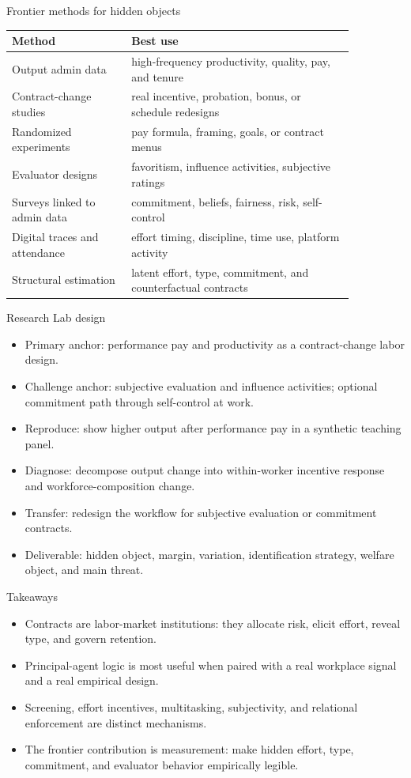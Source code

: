 \documentclass[aspectratio=169,11pt]{beamer}
\begin{document}
\begin{frame}{Frontier methods for hidden objects}
\small
\begin{tabular}{p{0.30\linewidth} p{0.56\linewidth}}
\toprule
Method & Best use \\
\midrule
Output admin data & high-frequency productivity, quality, pay, and tenure \\
Contract-change studies & real incentive, probation, bonus, or schedule redesigns \\
Randomized experiments & pay formula, framing, goals, or contract menus \\
Evaluator designs & favoritism, influence activities, subjective ratings \\
Surveys linked to admin data & commitment, beliefs, fairness, risk, self-control \\
Digital traces and attendance & effort timing, discipline, time use, platform activity \\
Structural estimation & latent effort, type, commitment, and counterfactual contracts \\
\bottomrule
\end{tabular}
\end{frame}

\begin{frame}{Research Lab design}
\begin{itemize}
    \item Primary anchor: performance pay and productivity as a contract-change labor design.
    \item Challenge anchor: subjective evaluation and influence activities; optional commitment path through self-control at work.
    \item Reproduce: show higher output after performance pay in a synthetic teaching panel.
    \item Diagnose: decompose output change into within-worker incentive response and workforce-composition change.
    \item Transfer: redesign the workflow for subjective evaluation or commitment contracts.
    \item Deliverable: hidden object, margin, variation, identification strategy, welfare object, and main threat.
\end{itemize}
\end{frame}

\begin{frame}{Takeaways}
\begin{itemize}
    \item Contracts are labor-market institutions: they allocate risk, elicit effort, reveal type, and govern retention.
    \item Principal-agent logic is most useful when paired with a real workplace signal and a real empirical design.
    \item Screening, effort incentives, multitasking, subjectivity, and relational enforcement are distinct mechanisms.
    \item The frontier contribution is measurement: make hidden effort, type, commitment, and evaluator behavior empirically legible.
\end{itemize}
\end{frame}
\end{document}
